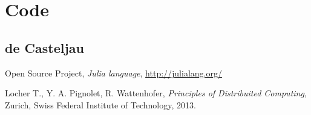 \documentclass{article}
\begin{document}
\section{Code}
\subsection{de Casteljau}
\label{sec:deCasteljau-code}


\newpage

\begin{thebibliography}{}

 Open Source Project,
  \emph{Julia language}, \url{http://julialang.org/}

 Locher T., Y. A. Pignolet, R. Wattenhofer,
  \textit{Principles of Distribuited Computing}, Zurich, Swiss Federal
  Institute of Technology, 2013.


\end{thebibliography}
\end{document}
